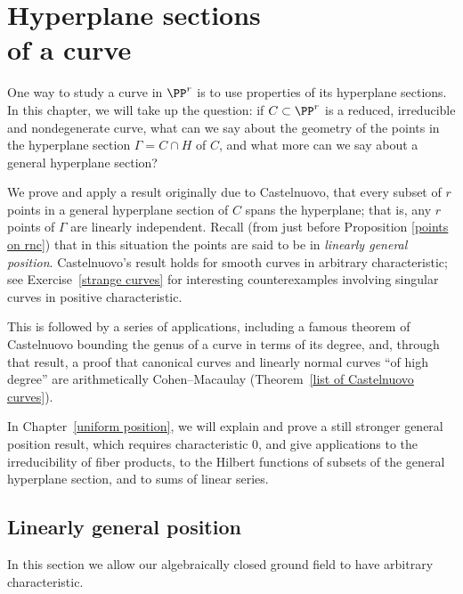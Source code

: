 


\chapter[Hyperplane sections of a curve]{Hyperplane sections\\of a curve}
\label{linear general position chapter}

One way to study a curve in $\PP^r$ is to use properties of its hyperplane
sections. In this chapter, we will take up the question: if $C \subset
\PP^r$ is a reduced, irreducible and nondegenerate curve, what can we say
about the geometry of the points in the  hyperplane section
$\Gamma = C \cap H$ of $C$, and what more can we say about a general hyperplane
section?

We prove and apply a result originally due to Castelnuovo,
%
that every subset of $r$ points in a
general hyperplane section
%
of $C$ spans the hyperplane; that is, any $r$
points of $\Gamma$ are linearly independent.
Recall (from just before Proposition \ref{points on rnc}) that
in this situation
the points
are said to be
in \emph{linearly general position}.
%
Castelnuovo's result
holds for smooth curves in
arbitrary characteristic;
%
see
Exercise~\ref{strange curves} for
interesting counterexamples involving singular curves in positive
characteristic.

This is followed by a series of applications,
including
a
%
famous theorem of Castelnuovo bounding the genus of a
curve in terms of its degree,
and, through that result, a proof that canonical curves and linearly
normal curves ``of high degree'' are arithmetically Cohen--Macaulay
%
(Theorem~\ref{list of Castelnuovo curves}).

{\footnotesize  %
In Chapter~\ref{uniform position}, we will explain and prove a still
stronger general position result, which requires characteristic 0, and
give applications to the irreducibility of fiber products, to the Hilbert
functions of subsets of the
general hyperplane section, and to sums of linear series.

}

\section{Linearly general position}\label{linearly general position
section}
In this section we
allow our algebraically closed ground field to
have arbitrary characteristic.

